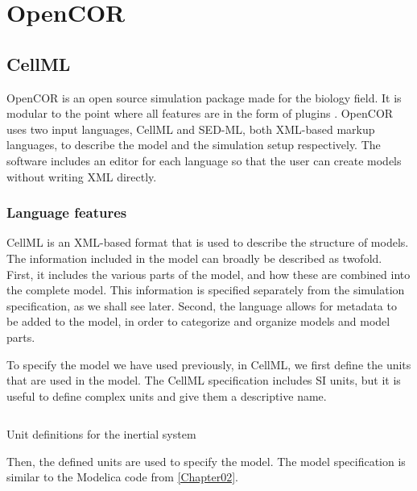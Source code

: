 \documentclass[\rootfolder/main.tex]{subfiles}
\begin{document}
\chapter{OpenCOR} %

\label{Chapter04} %

\section{CellML}

OpenCOR is an open source simulation package made for the biology field.
It is modular to the point where all features are in the form of plugins \cite{10.3389/fphys.2015.00026}.
OpenCOR uses two input languages, CellML and SED-ML, both XML-based markup languages, to describe the model and the simulation setup respectively.
The software includes an editor for each language so that the user can create models without writing XML directly.

\subsection{Language features}

CellML \cite{cuellar2003} is an XML-based format that is used to describe the structure of models.
The information included in the model can broadly be described as twofold.
First, it includes the various parts of the model, and how these are combined into the complete model.
This information is specified separately from the simulation specification, as we shall see later.
Second, the language allows for metadata to be added to the model, in order to categorize and organize models and model parts.

To specify the model we have used previously, in CellML, we first define the units that are used in the model.
The CellML specification includes SI units, but it is useful to define complex units and give them a descriptive name.

\begin{listing}[ht]
    \inputminted[fontsize=\footnotesize, lastline=27]{matlab}{\rootfolder/Models/OpenCOR/Inertial.input}
    \caption{Unit definitions for the inertial system\label{lst:inertial-cellml-units}}
\end{listing}

Then, the defined units are used to specify the model.
The model specification is similar to the Modelica code from \ref{Chapter02}.
\end{document}
